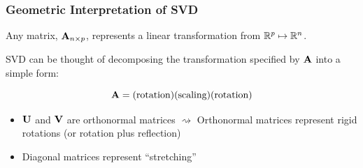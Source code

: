 \documentclass{beamer}
\begin{document}
\begin{frame}
  \frametitle{Geometric Interpretation of SVD}

Any matrix, $\mathbf{A}_{n \times p}$, represents a linear transformation from $\mathbb{R}^p \mapsto  \mathbb{R}^n$. 

\medskip
SVD can be thought of decomposing the transformation specified by $\mathbf{A}$ into a simple form:

$$ \mathbf{A} = (\text{rotation})(\text{scaling)}(\text{rotation})$$

\begin{itemize}
\item $\mathbf{U}$ and $\mathbf{V}$ are orthonormal matrices $\rightsquigarrow$ Orthonormal matrices represent rigid rotations (or rotation plus reflection)
\item Diagonal matrices represent ``stretching''
\end{itemize}


\end{frame}






\end{document}
